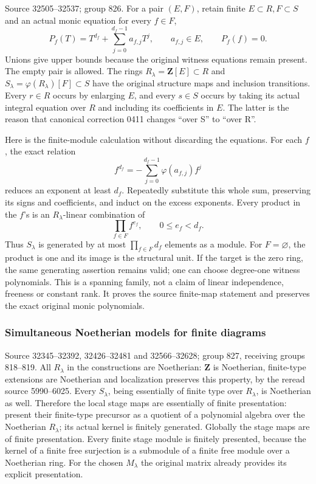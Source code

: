 Source 32505--32537; group 826. For a pair \((E,F)\), retain finite \(E\subset R,F\subset S\) and an actual monic equation for every \(f\in F\), \[
P_f(T)=T^{d_f}+\sum_{j=0}^{d_f-1}a_{f,j}T^j,\qquad
a_{f,j}\in E,\qquad P_f(f)=0.
\] Unions give upper bounds because the original witness equations remain present. The empty pair is allowed. The rings \(R_\lambda=\mathbf Z[E]\subset R\) and \(S_\lambda=\varphi(R_\lambda)[F]\subset S\) have the original structure maps and inclusion transitions. Every \(r\in R\) occurs by enlarging \(E\), and every \(s\in S\) occurs by taking its actual integral equation over \(R\) and including its coefficients in \(E\). The latter is the reason that canonical correction 0411 changes ``over S'' to ``over R''.

Here is the finite-module calculation without discarding the equations. For each \(f\), the exact relation \[
f^{d_f}=-\sum_{j=0}^{d_f-1}\varphi(a_{f,j})f^j
\] reduces an exponent at least \(d_f\). Repeatedly substitute this whole sum, preserving its signs and coefficients, and induct on the excess exponents. Every product in the \(f\)'s is an \(R_\lambda\)-linear combination of \[
\prod_{f\in F}f^{e_f},\qquad 0\le e_f<d_f.
\] Thus \(S_\lambda\) is generated by at most \(\prod_{f\in F}d_f\) elements as a module. For \(F=\varnothing\), the product is one and its image is the structural unit. If the target is the zero ring, the same generating assertion remains valid; one can choose degree-one witness polynomials. This is a spanning family, not a claim of linear independence, freeness or constant rank. It proves the source finite-map statement and preserves the exact original monic polynomials.

\subsubsection{Simultaneous Noetherian models for finite diagrams}\label{algebra-proof-037-simultaneous-noetherian-models-for-finite-diagrams}

Source 32345--32392, 32426--32481 and 32566--32628; group 827, receiving groups 818--819. All \(R_\lambda\) in the constructions are Noetherian: \(\mathbf Z\) is Noetherian, finite-type extensions are Noetherian and localization preserves this property, by the reread source 5990--6025. Every \(S_\lambda\), being essentially of finite type over \(R_\lambda\), is Noetherian as well. Therefore the local stage maps are essentially of finite presentation: present their finite-type precursor as a quotient of a polynomial algebra over the Noetherian \(R_\lambda\); its actual kernel is finitely generated. Globally the stage maps are of finite presentation. Every finite stage module is finitely presented, because the kernel of a finite free surjection is a submodule of a finite free module over a Noetherian ring. For the chosen \(M_\lambda\) the original matrix already provides its explicit presentation.

